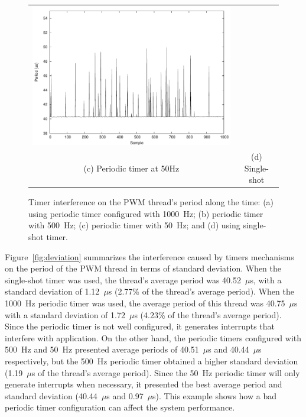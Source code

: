 \documentclass[final,3pd,times]{elsarticle}
\newcommand{\us}{$\mu$s}
\begin{document}
\begin{figure}[h!]
\begin{tabular}{cc}
\includegraphics[scale=0.48]{interference_single-shot} \\
(c) Periodic timer at 50Hz & (d) Single-shot \\
\end{tabular}
\caption{Timer interference on the PWM thread's period along the time: (a)
  using periodic timer configured with 1000~Hz; (b) periodic timer with
  500~Hz; (c) periodic timer with 50~Hz; and (d) using single-shot
  timer.}
\label{fig:interference}
\end{figure}

Figure~\ref{fig:deviation} summarizes the interference caused by timers
mechanisms on the period of the PWM thread in terms of standard
deviation. When the single-shot timer was used, the thread's average
period was 40.52~\us{}, with a standard deviation of 1.12~\us{} (2.77\%
of the thread's average period). When the 1000~Hz periodic timer was
used, the average period of this thread was 40.75~\us{} with a standard
deviation of 1.72~\us{} (4.23\% of the thread's average period). Since
the periodic timer is not well configured, it generates interrupts that
interfere with application.  On the other hand, the periodic timers
configured with 500~Hz and 50~Hz presented average periods of
40.51~\us{} and 40.44~\us{} respectively, but the 500~Hz periodic timer
obtained a higher standard deviation (1.19~\us{} of the thread's average
period).  Since the 50~Hz periodic timer will only generate interrupts
when necessary, it presented the best average period and standard
deviation (40.44~\us{} and 0.97~\us{}). This example shows how a bad
periodic timer configuration can affect the system performance.
\end{document}
